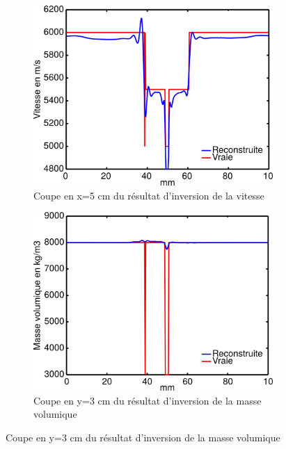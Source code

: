 \documentclass[a4paper,11pt]{report} %
\newenvironment{changemargin}[2]{\begin{list}{}{%
\setlength{\topsep}{0pt}%
\setlength{\leftmargin}{0pt}%
\setlength{\rightmargin}{0pt}%
\setlength{\listparindent}{\parindent}%
\setlength{\itemindent}{\parindent}%
\setlength{\parsep}{0pt plus 1pt}%
\addtolength{\leftmargin}{#1}%
\addtolength{\rightmargin}{#2}%
\setlength{\textwidth}{21cm}
}\item }{\end{list}}
\begin{document}
\begin{figure}[!h]
\begin{changemargin}{-2cm}{-2cm}
	\begin{subfigure}[b]{0.3\textwidth}
 		\includegraphics[width=\textwidth]{img/coupe_vp_multi.png}
 		\caption{Coupe en x=5 cm du résultat d'inversion de la vitesse}
	\end{subfigure}
    \begin{subfigure}[b]{0.3\textwidth}
 		\includegraphics[width=\textwidth]{img/coupe_rho_multi.png}
 		\caption{Coupe en y=3 cm du résultat d'inversion de la masse volumique}
	\end{subfigure}
\end{changemargin}
\end{figure}
\end{document}
